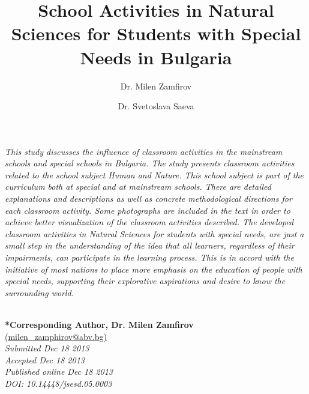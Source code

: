 \documentclass[11.5pt]{sig-alternate} %
\makeatletter
\let\oldabstract\abstract
\let\oldendabstract\endabstract
\renewenvironment{abstract} %
{\renewenvironment{quotation}%
               {\list{}{\addtolength{\leftmargin}{1em} %
                        \listparindent 1.5em%
                        \itemindent    \listparindent%
                        \rightmargin   \leftmargin%
                        \parsep        \z@ \@plus\p@}%
                \item\relax}%
               {\endlist}%
\oldabstract}
{\oldendabstract}
\makeatother
\begin{document}
\title{School Activities in Natural Sciences for Students with Special Needs in Bulgaria}

\author[1]{\large \color{blue}Dr. Milen Zamfirov}
\author[2]{\large \color{blue}Dr. Svetoslava Saeva}


\toappear{}
\maketitle
\begin{@twocolumnfalse} 
\begin{abstract}
\item 
\textit{This study discusses the influence of classroom activities in the mainstream schools and special schools in Bulgaria. The study presents classroom activities related to the school subject Human and Nature. This school subject is part of the curriculum both at special and at mainstream schools. There are detailed explanations and descriptions as well as concrete methodological directions for each classroom activity. Some photographs are included in the text in order to achieve better visualization of the classroom activities described. The developed classroom activities in Natural Sciences for students with special needs, are just a small step in the understanding of the idea that all learners, regardless of their impairments, can participate in the learning process. This is in accord with the initiative of most nations to place more emphasis on the education of people with special needs, supporting their explorative aspirations and desire to know the surrounding world.}
\\ \\
     
\end{abstract}
\end{@twocolumnfalse}


\textbf{*Corresponding Author, Dr. Milen Zamfirov }\\
\href{mailto:milen\_zamphirov@abv.bg}{(milen\_zamphirov@abv.bg)} \\
\textit{Submitted Dec 18 2013 }\\
\textit{Accepted Dec 18 2013} \\
\textit{Published online Dec 18 2013} \\
\textit{DOI: 10.14448/jsesd.05.0003} \\
\pagebreak
\clearpage
\end{document}
